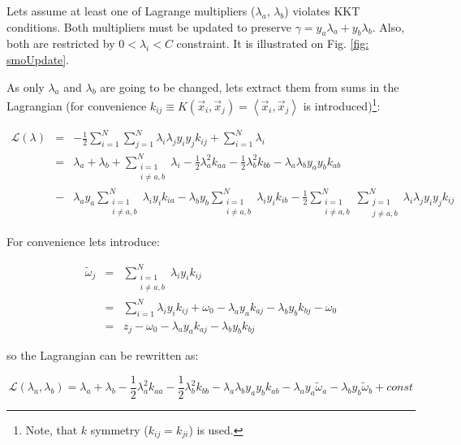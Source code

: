 Lets assume at least one of Lagrange multipliers ($\lambda_a$, $\lambda_b$) violates KKT conditions. Both multipliers must be updated to preserve $\gamma = y_a\lambda_a + y_b\lambda_b$. Also, both are restricted by $0 < \lambda_i < C$ constraint. It is illustrated on Fig. \ref{fig: smoUpdate}.

As only $\lambda_a$ and $\lambda_b$ are going to be changed, lets extract them from sums in the Lagrangian (for convenience $k_{ij} \equiv K (\vec x_i, \vec x_j) = \left<\vec x_i, \vec x_j\right>$ is introduced)\footnote{Note, that $k$ symmetry ($k_{ij} = k_{ji}$) is used.}:

\begin{eqnarray}
 \mathcal{L} (\lambda) & = & -\frac{1}{2}\sum_{i=1}^N\sum_{j=1}^N\lambda_i\lambda_jy_iy_jk_{ij} + \sum_{i=1}^{N}\lambda_i \\ \nonumber
 & = & \lambda_a + \lambda_b + \sum_{\substack{i = 1 \\ i\neq a,b}}^N \lambda_i - \frac{1}{2}\lambda_a^2 k_{aa} - \frac{1}{2}\lambda_b^2k_{bb} - \lambda_a \lambda_b y_a y_b k_{ab} \\ \nonumber
 & - &  \lambda_a y_a \sum_{\substack{i = 1 \\ i\neq a,b}}^N \lambda_i y_i k_{ia} -  \lambda_b y_b \sum_{\substack{i = 1 \\ i\neq a,b}}^N \lambda_i y_i k_{ib} - \frac{1}{2}\sum_{\substack{i = 1 \\ i\neq a,b}}^N \sum_{\substack{j = 1 \\ j \neq a,b}}^N\lambda_i \lambda_j y_i y_j k_{ij}
\end{eqnarray}

For convenience lets introduce:

\begin{eqnarray}
 \tilde\omega_j & = & \sum_{\substack{i = 1 \\ i\neq a,b}}^N \lambda_i y_i k_{ij} \\ \nonumber
 & = & \sum_{i = 1}^N \lambda_i y_i k_{ij} + \omega_0 - \lambda_a y_a k_{aj} - \lambda_b y_b k_{bj} - \omega_0 \\ \nonumber
 & = & z_j - \omega_0 - \lambda_a y_a k_{aj} - \lambda_b y_b k_{bj}
\end{eqnarray}

so the Lagrangian can be rewritten as:

\begin{equation}
 \mathcal{L} (\lambda_a, \lambda_b) = \lambda_a + \lambda_b - \frac{1}{2}\lambda_a^2 k_{aa} - \frac{1}{2}\lambda_b^2k_{bb} - \lambda_a\lambda_b y_a y_b k_{ab} - \lambda_a y_a \tilde\omega_a - \lambda_b y_b \tilde\omega_b + const
\end{equation}


